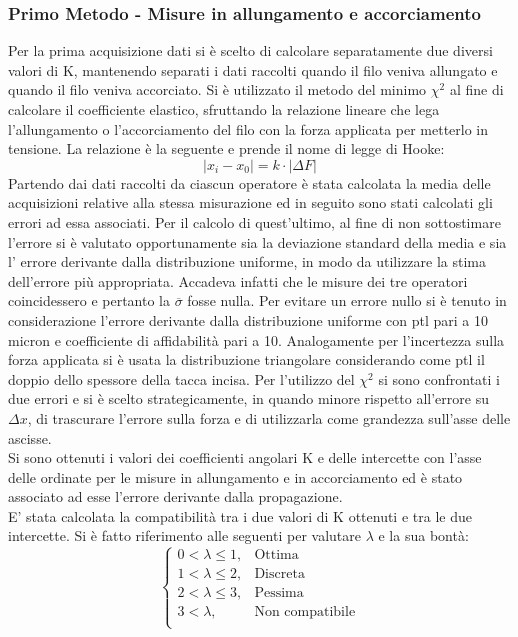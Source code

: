 \documentclass[a4paper,11pt,oneside]{article}
\begin{document}
\subsubsection*{Primo Metodo - Misure in allungamento e accorciamento}
Per la prima acquisizione dati si è scelto di calcolare separatamente due diversi valori di K, mantenendo separati i dati raccolti quando il filo veniva allungato e quando il filo veniva accorciato. Si è utilizzato il metodo del minimo $\chi^2$ al fine di calcolare il coefficiente elastico, sfruttando la relazione lineare che lega l'allungamento o l'accorciamento del filo con la forza applicata per metterlo in tensione. La relazione è la seguente e prende il nome di legge di Hooke:
\begin{equation*}
       \left | x_i - x_0  \right |  = k \cdot  \left | \Delta F \right |
\end{equation*}
Partendo dai dati raccolti da ciascun operatore è stata calcolata la media delle acquisizioni relative alla stessa misurazione ed in seguito sono stati calcolati gli errori ad essa associati. Per il calcolo di quest'ultimo, al fine di non sottostimare l'errore si è  valutato opportunamente sia la deviazione standard della media e sia l' errore derivante dalla distribuzione uniforme, in modo da utilizzare la stima dell'errore più appropriata. Accadeva infatti che le misure dei tre operatori coincidessero e pertanto la $\overline{\sigma}$ fosse nulla. Per evitare un errore nullo si è tenuto in considerazione l'errore derivante dalla distribuzione uniforme con ptl pari a 10 micron e coefficiente di affidabilità pari a 10.
Analogamente per l'incertezza sulla forza applicata si è usata la distribuzione triangolare considerando come ptl il doppio dello spessore della tacca incisa.
Per l'utilizzo del $\chi^2$ si sono confrontati i due errori e si è scelto strategicamente, in quando minore rispetto all'errore su $\Delta x$, di trascurare l'errore sulla forza e di utilizzarla come grandezza sull'asse delle ascisse.\\
Si sono ottenuti i valori dei coefficienti angolari K e delle intercette con l'asse delle ordinate per le misure in allungamento e in accorciamento ed è stato associato ad esse l'errore derivante dalla propagazione.\\
E' stata calcolata la compatibilità tra i due valori di K ottenuti e tra le due intercette. Si è fatto riferimento alle seguenti per valutare $\lambda$ e la sua bontà:
\begin{equation*}%
    \label{eq:cases}
    \begin{cases}
    0<\lambda\leq 1, & \text{Ottima}\\
    1<\lambda\leq2, & \text{Discreta}\\
    2<\lambda\leq3, & \text{Pessima}\\
    3<\lambda, & \text{Non compatibile}\\
    \end{cases}
\end{equation*}
\end{document}
